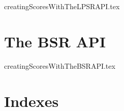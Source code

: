 \documentclass[11pt,a4paper]{report}
\begin{document}
{creatingScoresWithTheLPSRAPI.tex}


\part{The BSR API}


{creatingScoresWithTheBSRAPI.tex}



\part{Indexes}

\fancyhead[L]{}
\fancyhead[C]{\nouppercase\leftmark}
\fancyhead[R]{}

\printindex[Files]

\printindex[Options]

\printindex[MusicXML]

\printindex[Main]


\end{document}
